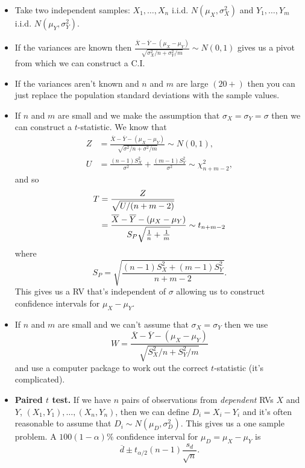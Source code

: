 \documentclass[10pt, two column]{article}
\begin{document}
\begin{itemize}
\item Take two independent samples: $X_{1}, \dots, X_{n}$ i.i.d. $N(\mu_{X}, \sigma_{X}^{2})$ and $Y_{1}, \dots, Y_{m}$ i.i.d. $N(\mu_{Y}, \sigma_{Y}^{2})$.
\item If the variances are known then $\frac{\overline{X} - \overline{Y} - (\mu_{X} - \mu_{Y})}{\sqrt{ \sigma_{X}^{2} / n + \sigma_{Y}^{2} / m}} \sim N(0,1)$ gives us a pivot from which we can construct a C.I. 
\item If the variances aren't known and $n$ and $m$ are large $(20+)$ then you can just replace the population standard deviations with the sample values. 
\item If $n$ and $m$ are small and we make the assumption that $\sigma_{X} = \sigma_{Y} = \sigma$ then we can construct a $t$-statistic. We know that
\begin{align*}
Z &= \frac{\overline{X} - \overline{Y} - (\mu_{X} - \mu_{Y})}{\sqrt{ \sigma^{2} / n + \sigma^{2} / m}} \sim N(0,1), \\
U &= \frac{(n-1)S_{X}^{2}}{\sigma^{2}} + \frac{(m-1)S_{Y}^{2}}{\sigma^{2}} \sim \chi^{2}_{n+m-2},
\end{align*}
and so \vspace{-5pt}
\begin{align*}
T &= \frac{Z}{\sqrt{U/(n+m-2)}} \\
&= \frac{\overline{X} - \overline{Y} - (\mu_{X} - \mu_{Y})}{S_{P}\sqrt{\frac{1}{n} + \frac{1}{m}}} \sim t_{n+m-2} \vspace{-5pt}
\end{align*} 
where
\[
S_{P} = \sqrt{\frac{(n-1)S_{X}^{2} + (m-1)S_{Y}^{2}}{n+m-2}}.
\]
This gives us a RV that's independent of $\sigma$ allowing us to construct confidence intervals for $\mu_{X} - \mu_{Y}$. 
\item If $n$ and $m$ are small and we can't assume that $\sigma_{X} = \sigma_{Y}$ then we use
\[ W = \frac{\overline{X}-\overline{Y} - (\mu_{X} - \mu_{Y})}{\sqrt{ S_{X}^{2} / n + S_{Y}^{2} / m}} \]
and use a computer package to work out the correct $t$-statistic (it's complicated). 
\item {\bf Paired $t$ test.} If we have $n$ pairs of observations from \emph{dependent} RVs $X$ and $Y$, $(X_{1},Y_{1}), \dots, (X_{n},Y_{n})$, then we can define $D_{i} = X_{i} - Y_{i}$ and it's often reasonable to assume that $D_{i} \sim N(\mu_{D},\sigma_{D}^{2})$. This gives us a one sample problem. A $100(1 - \alpha)\%$ confidence interval for $\mu_{D} = \mu_{X} - \mu_{Y}$ is 
\[ \overline{d} \pm t_{\alpha/2}(n-1)\frac{s_{d}}{\sqrt{n}}. \]
\end{itemize}
\end{document}
